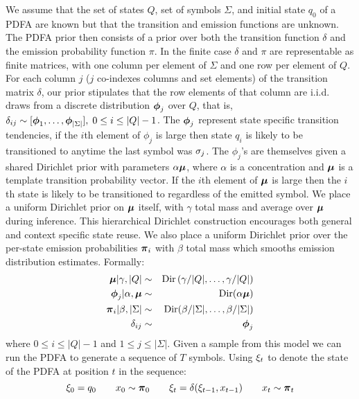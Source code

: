 We assume that the set of states $Q$, set of symbols $\Sigma$, and initial state $q_0$ of a PDFA are known but that the transition and emission functions are unknown.  The PDFA prior then consists of a prior over both the transition function $\delta$ and the emission probability function $\pi$.  In the finite case $\delta$ and $\pi$ are representable as finite matrices, with one column per element of $\Sigma$ and one row per element of $Q$.  For each column $j$ ($j$ co-indexes columns and set elements) of the transition matrix $\delta$, our prior stipulates that the row elements of that column are  i.i.d. draws from a discrete distribution $\bphi_j$ over $Q$, that is, $\delta_{ij} \sim [\bphi_1,\ldots,\bphi_{|\Sigma|}], \; 0 \leq i\leq|Q|-1$.  The $\bphi_j$ represent state specific transition tendencies, if the $i$th element of $\phi_{j}$ is large then state $q_i$ is likely to be transitioned to anytime the last symbol was $\symb_j$.   The $\phi_{j}$'s are   themselves given a shared Dirichlet prior with parameters $\alpha\bmu$, where $\alpha$ is a concentration and $\bmu$ is a template transition probability vector.   If the $i$th element of $\bmu$ is large then the $i$th state is likely to be transitioned to regardless of the emitted symbol.  We place a uniform Dirichlet prior on $\bmu$ itself, with $\gamma$ total mass and average over $\bmu$ during inference.  This hierarchical Dirichlet construction encourages both general and context specific state reuse.
 We also place a uniform Dirichlet prior over the per-state emission probabilities $\bpi_i$ with $\beta$ total mass which smooths emission distribution estimates.  Formally:
%
\begin{eqnarray}
\bmu|\gamma,|Q| & \sim & \mathrm{Dir}\left(\gamma/|Q|,\ldots,\gamma/|Q|\right) \label{gen:mu}  \\
\bphi_{j}|\alpha,\bmu  & \sim & \mathrm{Dir}(\alpha\bmu) \label{gen:phi} \\
\bpi_{i}|\beta,|\Sigma| & \sim & \mathrm{Dir}(\beta/|\Sigma|,\ldots,\beta/|\Sigma|) \label{gen:pi} \nonumber \\
\delta_{ij} & \sim & \bphi_{j} \label{gen:delta} \nonumber
\end{eqnarray}
%
where $0 \leq i \leq |Q|-1$ and $1 \leq j \leq |\Sigma|$.  Given a sample from this model we can run the PDFA to generate a sequence of $T$ symbols.  Using $\q_t$ to denote the state of the PDFA at position $t$ in the sequence:
%
\begin{equation}
\q_0 = \state_0 \qquad
x_0 \sim \bpi_0 \qquad
\q_t = \delta(\q_{t-1},x_{t-1}) \qquad
x_t \sim \bpi_t \label{gen} \nonumber
\end{equation}
